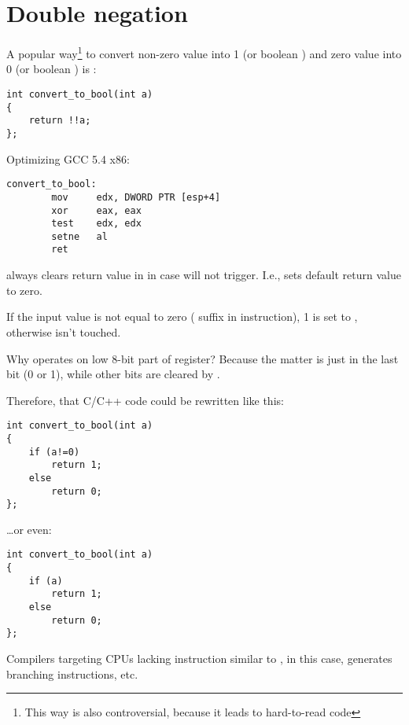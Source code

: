 \chapter{Double negation}

A popular way\footnote{This way is also controversial, because it leads to hard-to-read code} to convert non-zero value into 1 (or boolean ) and zero value into 0 (or boolean ) is :

\begin{lstlisting}
int convert_to_bool(int a)
{
	return !!a;
};
\end{lstlisting}

Optimizing GCC 5.4 x86:

\begin{lstlisting}
convert_to_bool:
        mov     edx, DWORD PTR [esp+4]
        xor     eax, eax
        test    edx, edx
        setne   al
        ret
\end{lstlisting}

 always clears return value in \EAX in case  will not trigger.
I.e.,  sets default return value to zero.

If the input value is not equal to zero ( suffix in  instruction),
1 is set to \AL, otherwise \AL isn't touched.

Why  operates on low 8-bit part of \EAX register?
Because the matter is just in the last bit (0 or 1), while other bits are cleared by .

Therefore, that C/C++ code could be rewritten like this:

\begin{lstlisting}
int convert_to_bool(int a)
{
	if (a!=0)
		return 1;
	else
		return 0;
};
\end{lstlisting}

\dots or even:

\begin{lstlisting}
int convert_to_bool(int a)
{
	if (a)
		return 1;
	else
		return 0;
};
\end{lstlisting}

Compilers targeting \ac{CPU}s lacking instruction similar to , in this case,
generates branching instructions, etc.

